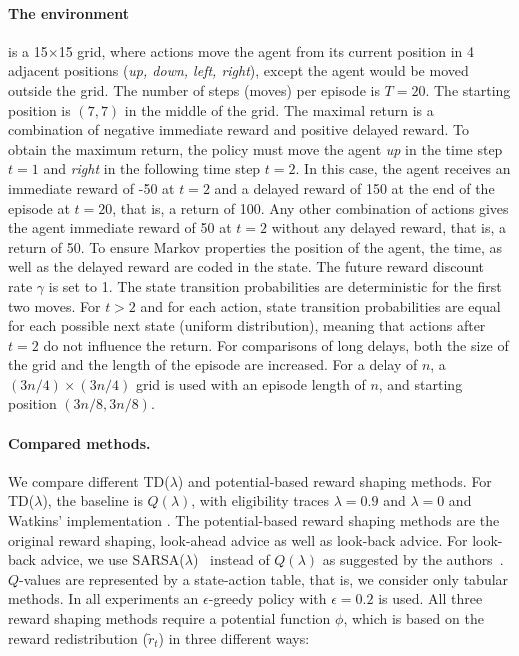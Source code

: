 \documentclass{article}
\begin{document}
\begin{appendices}
\paragraph{ The environment } is a 15$\times$15 grid, where 
actions move the agent from its current position 
in 4 adjacent positions ({\em up, down, left, right}), 
except the agent would be moved outside the grid. 
The number of steps (moves) per episode is $T=20$. 
The starting position is $(7,7)$ in the middle of the grid. 
The maximal return is a combination of negative immediate reward 
and positive delayed reward.
To obtain the maximum return, 
the policy must move the agent {\em up} in the time step $t=1$ and  
{\em right} in the following time step $t=2$. In this case, the 
agent receives an immediate reward of -50 at $t=2$ and 
a delayed reward of 150 at the end of the episode at $t=20$, 
that is, a return of 100.
Any other combination of actions gives the agent immediate reward of 50 at $t=2$ without
any delayed reward, that is, a return of 50.
To ensure Markov properties the position of the agent, the time, as well as the delayed reward
are coded in the state. The future reward discount rate $\gamma$ is set to 1.
The state transition probabilities are deterministic for the first two moves.
For $t>2$ and for each action, state transition probabilities 
are equal for each possible next state (uniform distribution), 
meaning that 
actions after $t=2$ do not influence the return.
For comparisons of long delays, 
both the size of the grid and the length of the episode are increased. 
For a delay of $n$, a $(3n/4) \times (3n/4)$ grid is used
with an episode length of $n$, 
and starting position $(3n/8, 3n/8)$.

\paragraph{Compared methods.}
We compare different TD($\lambda$) and potential-based reward shaping methods.
For TD($\lambda$), the baseline is $Q(\lambda)$, 
with eligibility traces $\lambda=0.9$ and $\lambda=0$ and Watkins' implementation \cite{Watkins:89}. 
The potential-based reward shaping methods are the original reward shaping, 
look-ahead advice as well as look-back advice. 
For look-back advice, we use SARSA($\lambda$)~\cite{Rummery:94} instead of $Q(\lambda)$ 
as suggested by the authors~\cite{Wiewiora:03}. 
$Q$-values are represented by a state-action table, that is, we consider only
tabular methods.
In all experiments an $\epsilon$-greedy policy with $\epsilon = 0.2$ is used.
All three reward shaping methods 
require a potential function $\phi$,
which is based on the reward redistribution ($\tilde{r}_t$) 
in three different ways:



\end{appendices}
\end{document}
